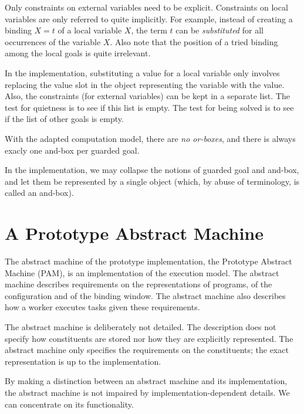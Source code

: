 Only constraints on external variables need to be explicit.
Constraints on local variables are only referred to quite implicitly.
For example, instead of creating a binding $X = t$ of a local variable
$X$, the term $t$ can be {\em substituted} for all occurrences of the
variable $X$.  Also note that the position of a tried binding among
the local goals is quite irrelevant.

In the implementation, substituting a value for a local variable only
involves replacing the value slot in the object representing the
variable with the value.  Also, the constraints (for external
variables) can be kept in a separate list.  The test for quietness is
to see if this list is empty.  The test for being solved is to see if
the list of other goals is empty.

With the adapted computation model, there are {\em no or-boxes}, and
there is always exacly one and-box per guarded goal.

In the implementation, we may collapse the notions of guarded goal and
and-box, and let them be represented by a single object (which, by
abuse of terminology, is called an and-box).


\chapter{A Prototype Abstract Machine} \label{ch:absmachine}

The abstract machine of the prototype implementation, the Prototype
Abstract Machine (PAM), is an implementation of the execution model.
The abstract machine describes requirements on the representations of
programs, of the configuration and of the binding window. The abstract
machine also describes how a worker executes tasks given these
requirements.

The abstract machine is deliberately not detailed.
The description does not specify how constituents are stored nor how
they are explicitly represented. The abstract machine only specifies the 
requirements on the constituents; the exact representation is up to 
the implementation. 

By making a distinction between an abstract machine and its
implementation, the abstract machine is not impaired by
implementation-dependent details. We can concentrate on its
functionality.

